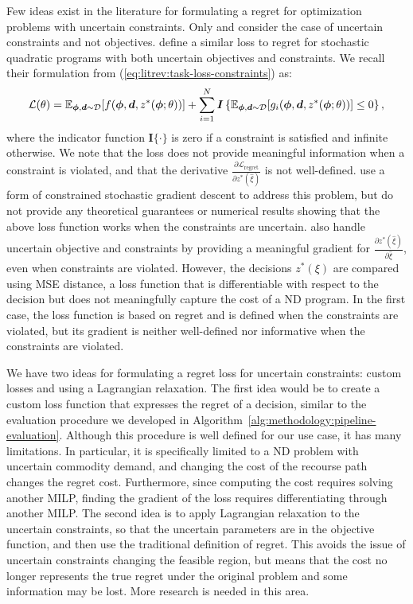 Few ideas exist in the literature for formulating a regret for optimization problems with uncertain constraints. Only \cite{dontiTaskbasedEndtoendModel2017} and \cite{paulusCombOptNetFitRight2022} consider the case of uncertain constraints and not objectives.  \cite{dontiTaskbasedEndtoendModel2017} define a similar loss to regret for stochastic quadratic programs with both uncertain objectives and constraints. We recall their formulation from (\ref{eq:litrev:task-loss-constraints}) as:
\begin{equation}
    \mathcal{L}(\theta) = \mathbb{E}_{{\bm{\phi}}, {\bm{d}} \sim \mathcal{D}}[f({\bm{\phi}}, {\bm{d}}, z^*({\bm{\phi}} ; \theta))] + \sum_{i=1}^{N} \bm{I}\left\{\mathbb{E}_{{\bm{\phi}}, {\bm{d}} \sim \mathcal{D}}[g_i({\bm{\phi}}, {\bm{d}}, z^*({\bm{\phi}} ; \theta))] \leq  0\right\},
\end{equation}
where the indicator function $\bm{I}\{\cdot\}$ is zero if a constraint is satisfied and infinite otherwise. We note that the loss does not provide meaningful information when a constraint is violated, and that the derivative $\tfrac{\partial \mathcal{L}_\text{regret}}{\partial z^*(\hat{\xi})}$ is not well-defined. \cite{dontiTaskbasedEndtoendModel2017} use a form of constrained stochastic gradient descent to address this problem, but do not provide any theoretical guarantees or numerical results showing  that the above loss function works when the constraints are uncertain.
\cite{paulusCombOptNetFitRight2022} also handle uncertain objective and constraints by providing a meaningful gradient for $\tfrac{\partial z^*(\hat{\xi})}{\partial \hat{\xi}}$, even when constraints are violated. However, the decisions $z^*(\xi)$ are compared using MSE distance, a loss function that is differentiable with respect to the decision but does not meaningfully capture the cost of a ND program. In the first case, the loss function is based on regret and is defined when the constraints are violated, but its gradient is neither well-defined nor informative when the constraints are violated.

We have two ideas for formulating a regret loss for uncertain constraints: custom losses and using a Lagrangian relaxation. The first idea would be to create a custom loss function that expresses the regret of a decision, similar to the evaluation procedure we developed in Algorithm~\ref{alg:methodology:pipeline-evaluation}. Although this procedure is well defined for our use case, it has many limitations. In particular, it is specifically limited to a ND problem with uncertain commodity demand, and changing the cost of the recourse path changes the regret cost. Furthermore, since computing the cost requires solving another MILP, finding the gradient of the loss requires differentiating through another MILP. The second idea is to apply Lagrangian relaxation to the uncertain constraints, so that the uncertain parameters are in the objective function, and then use the traditional definition of regret. This avoids the issue of uncertain constraints changing the feasible region, but means that the cost no longer represents the true regret under the original problem and some information may be lost. More research is needed in this area.

